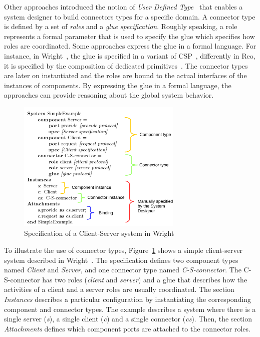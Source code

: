 Other approaches introduced the notion of \emph{User Defined Type}~\cite{uniconbib,wrightbib,reobib} that enables a system designer to build connectors types for a specific domain. A connector type is defined by a set of \emph{roles} and a \emph{glue specification}. Roughly speaking, a role represents a formal parameter that is used to specify the glue which specifies how roles are coordinated. Some approaches express the glue in a formal language. For instance, in Wright~\cite{wrightbib}, the glue is specified in a variant of CSP~\cite{csphoarebib}, differently in Reo, it is specified by the composition of dedicated primitives~\cite{reobib}. The connector types are later on instantiated and the roles are bound to the actual interfaces of the instances of components. By expressing the glue in a formal language, the approaches can provide reasoning about the global system behavior. 

\begin{figure}
	\begin{center}
		\includegraphics[width=0.7\textwidth]{background/figs/wrightspec}
		\caption{Specification of a Client-Server system in Wright~\cite{wrightbib}}
		\label{fig:wrightspec}
	\end{center}
\end{figure}

To illustrate the use of connector types, Figure~\ref{fig:wrightspec} shows a simple client-server system described in Wright~\cite{wrightbib}. The specification defines two component types named \emph{Client} and \emph{Server}, and one connector type named \emph{C-S-connector}. The C-S-connector has two roles (\emph{client} and \emph{server}) and a glue that describes how the activities of a client and a server roles are usually coordinated. The section \emph{Instances} describes a particular configuration by instantiating the corresponding component and connector types. The example describes a system where there is a single server (\emph{s}), a single client (\emph{c}) and a single connector (\emph{cs}). Then, the section \emph{Attachments} defines which component ports are attached to the connector roles.

